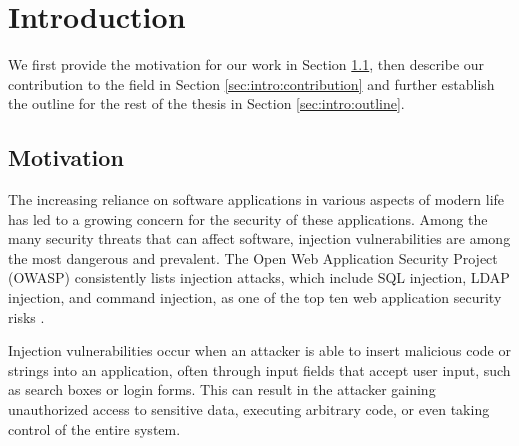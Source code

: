 \chapter{Introduction}
\label{chapter:introduction}

\begin{comment}
	Your introduction goes here
	\begin{itemize}
		\item Generic description of the broad field of research
		\item Current state of research
		\item What's the gap that you're trying to fill?
		\item Short motivation
		\item Summary of the most important results
		\item Your contribution
		\item Structure of the thesis
	\end{itemize}
	
	1-2.5 pages
	
	This text is not too detailed. Start quite high-level, then narrow down until
	you reach your topic. After the introduction, the reader must want to read the
	rest of your thesis and understand the relevance. However, it doesn't have to
	be super technical.
\end{comment}

We first provide the motivation for our work in Section \ref{sec:intro:motivation}, then describe our contribution to the field in Section \ref{sec:intro:contribution} and further establish the outline for the rest of the thesis in Section \ref{sec:intro:outline}.

\section{Motivation}\label{sec:intro:motivation}

The increasing reliance on software applications in various aspects of modern life has led to a growing concern for the security of these applications. Among the many security threats that can affect software, injection vulnerabilities are among the most dangerous and prevalent. The Open Web Application Security Project (OWASP) consistently lists injection attacks, which include SQL injection, LDAP injection, and command injection, as one of the top ten web application security risks \cite{owasp}.

Injection vulnerabilities occur when an attacker is able to insert malicious code or strings into an application, often through input fields that accept user input, such as search boxes or login forms. This can result in the attacker gaining unauthorized access to sensitive data, executing arbitrary code, or even taking control of the entire system.

